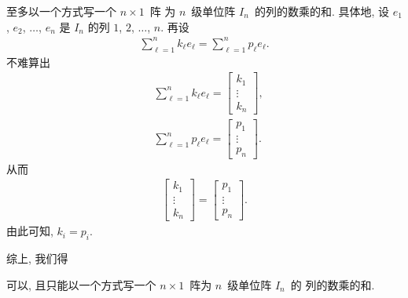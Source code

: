 \documentclass[../libro.tex]{subfiles}
\begin{document}
至多以一个方式写一个 \(n \times 1\)~阵%
为 \(n\)~级单位阵 \(I_n\)~的列的数乘的和.
具体地, 设 \(e_1\), \(e_2\), \(\dots\), \(e_n\) 是
\(I_n\) 的列 \(1\), \(2\), \(\dots\), \(n\).
再设
\begin{align*}
    \sum_{\ell = 1}^{n} {k_\ell e_\ell}
    = \sum_{\ell = 1}^{n} {p_\ell e_\ell}.
\end{align*}
不难算出
\begin{align*}
    & \sum_{\ell = 1}^{n} {k_\ell e_\ell} =
    \begin{bmatrix}
        k_1    \\
        \vdots \\
        k_n
    \end{bmatrix}, \\
    & \sum_{\ell = 1}^{n} {p_\ell e_\ell} =
    \begin{bmatrix}
        p_1    \\
        \vdots \\
        p_n
    \end{bmatrix}.
\end{align*}
从而
\begin{align*}
    \begin{bmatrix}
        k_1    \\
        \vdots \\
        k_n
    \end{bmatrix}
    =
    \begin{bmatrix}
        p_1    \\
        \vdots \\
        p_n
    \end{bmatrix}.
\end{align*}
由此可知, \(k_i = p_i\).

综上, 我们得

\begin{theorem}
    可以, 且只能以一个方式写一个
    \(n \times 1\)~阵为 \(n\)~级单位阵 \(I_n\)~的%
    列的数乘的和.
\end{theorem}
\end{document}
